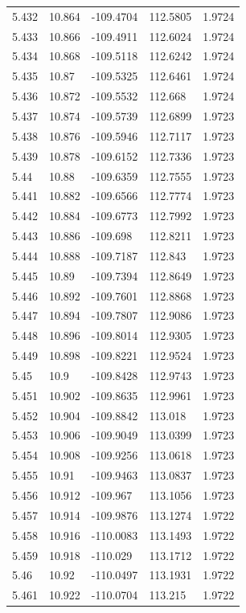 \begin{tabular}{lllll}
5.432 & 10.864 & -109.4704 & 112.5805 & 1.9724 \\
5.433 & 10.866 & -109.4911 & 112.6024 & 1.9724 \\
5.434 & 10.868 & -109.5118 & 112.6242 & 1.9724 \\
5.435 & 10.87 & -109.5325 & 112.6461 & 1.9724 \\
5.436 & 10.872 & -109.5532 & 112.668 & 1.9724 \\
5.437 & 10.874 & -109.5739 & 112.6899 & 1.9723 \\
5.438 & 10.876 & -109.5946 & 112.7117 & 1.9723 \\
5.439 & 10.878 & -109.6152 & 112.7336 & 1.9723 \\
5.44 & 10.88 & -109.6359 & 112.7555 & 1.9723 \\
5.441 & 10.882 & -109.6566 & 112.7774 & 1.9723 \\
5.442 & 10.884 & -109.6773 & 112.7992 & 1.9723 \\
5.443 & 10.886 & -109.698 & 112.8211 & 1.9723 \\
5.444 & 10.888 & -109.7187 & 112.843 & 1.9723 \\
5.445 & 10.89 & -109.7394 & 112.8649 & 1.9723 \\
5.446 & 10.892 & -109.7601 & 112.8868 & 1.9723 \\
5.447 & 10.894 & -109.7807 & 112.9086 & 1.9723 \\
5.448 & 10.896 & -109.8014 & 112.9305 & 1.9723 \\
5.449 & 10.898 & -109.8221 & 112.9524 & 1.9723 \\
5.45 & 10.9 & -109.8428 & 112.9743 & 1.9723 \\
5.451 & 10.902 & -109.8635 & 112.9961 & 1.9723 \\
5.452 & 10.904 & -109.8842 & 113.018 & 1.9723 \\
5.453 & 10.906 & -109.9049 & 113.0399 & 1.9723 \\
5.454 & 10.908 & -109.9256 & 113.0618 & 1.9723 \\
5.455 & 10.91 & -109.9463 & 113.0837 & 1.9723 \\
5.456 & 10.912 & -109.967 & 113.1056 & 1.9723 \\
5.457 & 10.914 & -109.9876 & 113.1274 & 1.9722 \\
5.458 & 10.916 & -110.0083 & 113.1493 & 1.9722 \\
5.459 & 10.918 & -110.029 & 113.1712 & 1.9722 \\
5.46 & 10.92 & -110.0497 & 113.1931 & 1.9722 \\
5.461 & 10.922 & -110.0704 & 113.215 & 1.9722 \\

\end{tabular}
